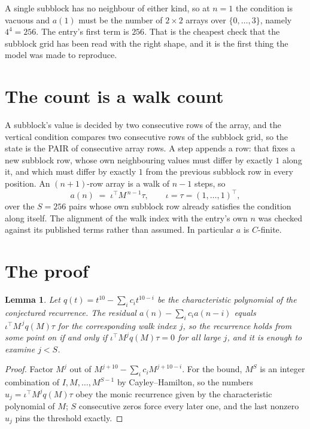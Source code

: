 \documentclass[11pt,a4paper]{article}
\theoremstyle{plain}
\newtheorem{lemma}[theorem]{Lemma}
\theoremstyle{definition}
\begin{document}
A single subblock has no neighbour of either kind, so at $n=1$ the condition is vacuous and
$a(1)$ must be the number of $2\times2$ arrays over $\{0,\dots,3\}$, namely
$4^{4}=256$. The entry's first term is $256$.
That is the cheapest check that the subblock grid has been read with the right shape, and it
is the first thing the model was made to reproduce.

\section{The count is a walk count}

A subblock's value is decided by two consecutive rows of the array, and the
vertical condition compares two consecutive rows of the subblock grid, so the state is the
PAIR of consecutive array rows. A step appends a row: that fixes a new subblock row, whose own
neighbouring values must differ by exactly $1$ along it, and which must differ by exactly
$1$ from the previous subblock row in every position. An $(n+1)$-row array is a walk of
$n-1$ steps, so
\[
a(n)\;=\;\iota^{\!\top}M^{\,n-1}\tau,\qquad\iota=\tau=(1,\dots,1)^{\!\top},
\]
over the $S=256$ pairs whose own subblock row already satisfies the condition along itself.
The alignment of the walk index with the entry's own $n$ was checked against its published
terms rather than assumed. In particular $a$ is $C$-finite.

\section{The proof}

\begin{lemma}\label{lem:crit}
Let $q(t)=t^{10}-\sum_i c_it^{10-i}$ be the characteristic polynomial of the
conjectured recurrence. The residual $a(n)-\sum_ic_ia(n-i)$ equals
$\iota^{\!\top}M^{\,j}q(M)\tau$ for the corresponding walk index $j$, so the recurrence
holds from some point on if and only if $\iota^{\!\top}M^{j}q(M)\tau=0$ for all large $j$,
and it is enough to examine $j<S$.
\end{lemma}

\begin{proof}
Factor $M^{j}$ out of $M^{j+10}-\sum_ic_iM^{j+10-i}$. For the bound, $M^{S}$
is an integer combination of $I,M,\dots,M^{S-1}$ by Cayley--Hamilton, so the numbers
$u_j=\iota^{\!\top}M^{j}q(M)\tau$ obey the monic recurrence given by the characteristic
polynomial of $M$; $S$ consecutive zeros force every later one, and the last nonzero $u_j$
pins the threshold exactly.
\end{proof}
\end{document}
